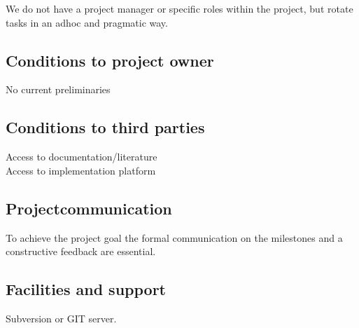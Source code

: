\documentclass{article}
\begin{document}
We do not have a project manager or specific roles within the project, but rotate tasks in an adhoc and pragmatic way.

\subsection{Conditions to project owner}

No current preliminaries

\subsection{Conditions to third parties}

Access to documentation/literature\\
Access to implementation platform

\subsection{Projectcommunication}

To achieve the project goal the formal communication on the milestones and a constructive feedback are essential.

\subsection{Facilities and support}

Subversion or GIT server.
\end{document}
